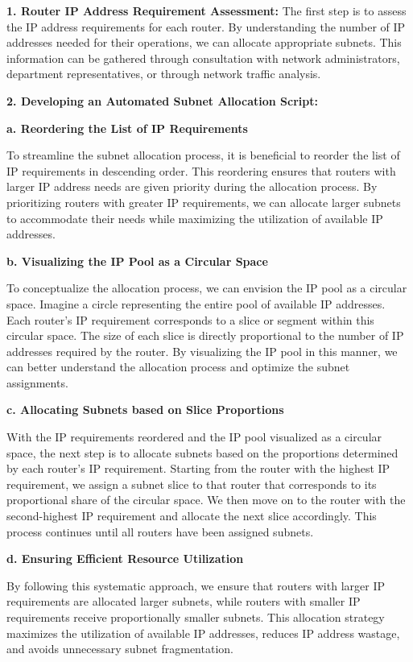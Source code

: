 \textbf{1. Router IP Address Requirement Assessment:} The first step is to assess the IP address requirements for each router. By understanding the number of IP addresses needed for their operations, we can allocate appropriate subnets. This information can be gathered through consultation with network administrators, department representatives, or through network traffic analysis.

\textbf{2. Developing an Automated Subnet Allocation Script:}


\textbf{a. Reordering the List of IP Requirements}

To streamline the subnet allocation process, it is beneficial to reorder the list of IP requirements in descending order. This reordering ensures that routers with larger IP address needs are given priority during the allocation process. By prioritizing routers with greater IP requirements, we can allocate larger subnets to accommodate their needs while maximizing the utilization of available IP addresses.

\textbf{b. Visualizing the IP Pool as a Circular Space}

To conceptualize the allocation process, we can envision the IP pool as a circular space. Imagine a circle representing the entire pool of available IP addresses. Each router's IP requirement corresponds to a slice or segment within this circular space. The size of each slice is directly proportional to the number of IP addresses required by the router. By visualizing the IP pool in this manner, we can better understand the allocation process and optimize the subnet assignments.

\textbf{c. Allocating Subnets based on Slice Proportions}

With the IP requirements reordered and the IP pool visualized as a circular space, the next step is to allocate subnets based on the proportions determined by each router's IP requirement. Starting from the router with the highest IP requirement, we assign a subnet slice to that router that corresponds to its proportional share of the circular space. We then move on to the router with the second-highest IP requirement and allocate the next slice accordingly. This process continues until all routers have been assigned subnets.

\textbf{d. Ensuring Efficient Resource Utilization}

By following this systematic approach, we ensure that routers with larger IP requirements are allocated larger subnets, while routers with smaller IP requirements receive proportionally smaller subnets. This allocation strategy maximizes the utilization of available IP addresses, reduces IP address wastage, and avoids unnecessary subnet fragmentation.


